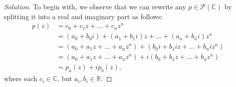 \documentclass{article}
\newenvironment{solution}{\begin{proof}[Solution]}{\end{proof}}
\newcommand{\CC}{\mathbb{C}}
\newcommand{\RR}{\mathbb{R}}
\begin{document}
\begin{solution}
\begin{comment}
		Then, we note that $\lvert c \rvert^2 \in \RR$. Furthermore, we observe that for each $\lambda_i$ which is a root of $p(z)\overline{p(\overline{z})}$, its conjugate $\overline{\lambda_i}$ is also a root. Then, there are two cases.
		
		First, if $\lambda_i = \overline{\lambda_i}$, then we see that, in fact, $\lambda_i \in \RR$ and we can combine the terms together to get $(z-\lambda_i)^{2}$.
		
		Meanwhile, if $\lambda_i\neq\overline{\lambda_i}$, then we see that these pairs of roots are the roots of some quadratic $z^{2} + b_{i}z + c_{i}$, where $b_{i}, c_{i} \in \RR$ and $b_{i}^{2} < 4c_{i}$.
		
		Then, we can rewrite our polynomial $q(z) = p(z)\overline{p(\overline{z})}$ to be as such:
		\begin{equation*}
			q(z) = \lvert c \rvert^{2}(z-\lambda_1)^{2}\cdots(z-\lambda_m)^{2}(z^{2}+b_{m+1}z+c_{m+1})\cdots(z^{2}+b_{n}z+c_{n}).
		\end{equation*}
	
		And we observe that since $c, \lambda_1, \ldots, \lambda_m, b_{m+1}, c_{m+1}, \ldots, b_{n}, c_{n} \in \RR$, it follows then that $q(z) \in \mathscr{P}(\RR)$ as desired.
		
		In the case where $p$ is a constant polynomial, we observe that regardless of where we evaluate $p$ at, it's always going to be some constant $c \in \CC$.
		
		Then, we note that for $p(z) = c$, for $c \in \CC$, we have:
		\begin{align*}
			p(\overline{z}) &= c \\
			\overline{p(\overline{z})} &= \overline{c}
		\end{align*}
	
		So, $p(z)\overline{p(\overline{z})} = c\overline{c} = \lvert c \rvert^{2}$, which is in $\RR$. So, $q(z) \in \mathscr{P}(\RR)$ as desired.
		\end{comment}
		To begin with, we observe that we can rewrite any $p \in \mathscr{P}(\CC)$ by splitting it into a real and imaginary part as follows:
		\begin{align*}
			p(z) &= c_{0} + c_{1}z + \ldots + c_{n}z^{n} \\
			&= (a_{0} + b_{0}i) + (a_{1} + b_{1}i)z + \ldots + (a_{n} + b_{n}i)z^{n} \\
			&= (a_{0} + a_{1}z + \ldots + a_{n}z^{n}) + (b_{0}i + b_{1}i z + \ldots + b_{n}i z^{n})  \\
			&= (a_{0} + a_{1}z + \ldots + a_{n}z^{n}) + i(b_{0} + b_{1}z + \ldots + b_{n}z^{n}) \\
			&= p_{a}(z) + ip_{b}(z),
		\end{align*}
		where each $c_{i} \in \CC$, but $a_{i}, b_{i} \in \RR$.
	

\end{solution}
\end{document}
